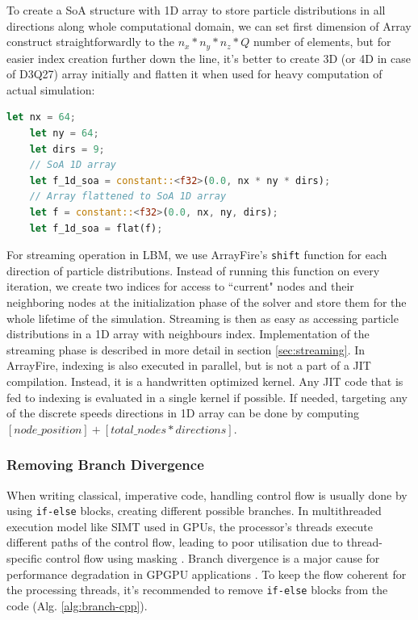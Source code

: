 To create a SoA structure with 1D array to store particle distributions in all directions along whole computational domain, we can set first dimension of Array construct straightforwardly to the $n_x*n_y*n_z*Q$ number of elements, but for easier index creation further down the line, it's better to create 3D (or 4D in case of D3Q27) array initially and flatten it when used for heavy computation of actual simulation:

\begin{lstlisting}[language=Rust, caption=Creating SoA structure representation of D2Q9 lattice with ArrayFire in Rust.]
	let nx = 64;
	let ny = 64;
	let dirs = 9;
	// SoA 1D array
	let f_1d_soa = constant::<f32>(0.0, nx * ny * dirs);
	// Array flattened to SoA 1D array
	let f = constant::<f32>(0.0, nx, ny, dirs);
	let f_1d_soa = flat(f);
\end{lstlisting}

For streaming operation in LBM, we use ArrayFire's \texttt{shift} function for each direction of particle distributions. Instead of running this function on every iteration, we create two indices for access to ``current" nodes and their neighboring nodes at the initialization phase of the solver and store them for the whole lifetime of the simulation. Streaming is then as easy as accessing particle distributions in a 1D array with neighbours index. Implementation of the streaming phase is described in more detail in section \ref{sec:streaming}. In ArrayFire, indexing is also executed in parallel, but is not a part of a JIT compilation. Instead, it is a handwritten optimized kernel. Any JIT code that is fed to indexing is evaluated in a single kernel if possible. If needed, targeting any of the discrete speeds directions in 1D array can be done by computing $[node\_position] + [total\_nodes * directions]$. 

\subsubsection{Removing Branch Divergence}
When writing classical, imperative code, handling control flow is usually done by using \texttt{if-else} blocks, creating different possible branches. In multithreaded execution model like SIMT used in GPUs, the processor's threads execute different paths of the control flow, leading to poor utilisation due to thread-specific control flow using masking \citep{delboscOptimizedImplementationLattice2014}. Branch divergence is a major cause for performance degradation in GPGPU applications \citep{TAN2017649}. To keep the flow coherent for the processing threads, it's recommended to remove \texttt{if-else} blocks from the code (Alg. \ref{alg:branch-cpp}).

